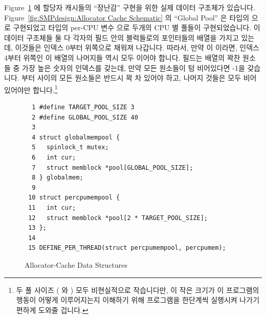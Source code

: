 Figure~\ref{fig:SMPdesign:Allocator-Cache Data Structures} 에 할당자 캐시들의
``장난감'' 구현을 위한 실제 데이터 구조체가 있습니다.
Figure~\ref{fig:SMPdesign:Allocator Cache Schematic} 의 ``Global Pool'' 은
 타입의  으로 구현되었고  타입의 per-CPU 변수  으로 두개의 CPU 별 풀들이
구현되었습니다.
이 데이터 구조체들 둘 다 각자의  필드 안의 블럭들로의 포인터들의
배열을 가지고 있는데, 이것들은 인덱스 0부터 위쪽으로 채워져 나갑니다.
따라서, 만약  이  이라면, 인덱스 4부터 위쪽인 이
배열의 나머지들 역시 모두  이어야 합니다.
 필드는  배열의 꽉찬 원소들 중 가장 높은 숫자의 인덱스를
갖는데, 만약 모든 원소들이 텅 비어있다면 -1을 갖습니다.
 부터  사이의 모든
원소들은 반드시 꽉 차 있어야 하고, 나머지 것들은 모두 비어있어야만
합니다.\footnote{
	두 풀 사이즈 ( 와 ) 모두
	비현실적으로 작습니다만, 이 작은 크기가 이 프로그램의 행동이 어떻게
	이루어지는지 이해하기 위해 프로그램을 한단계씩 실행시켜 나가기 편하게
	도와줄 겁니다.}

\begin{figure}[htbp]
{ \scriptsize
\begin{verbatim}
  1 #define TARGET_POOL_SIZE 3
  2 #define GLOBAL_POOL_SIZE 40
  3
  4 struct globalmempool {
  5   spinlock_t mutex;
  6   int cur;
  7   struct memblock *pool[GLOBAL_POOL_SIZE];
  8 } globalmem;
  9
 10 struct percpumempool {
 11   int cur;
 12   struct memblock *pool[2 * TARGET_POOL_SIZE];
 13 };
 14
 15 DEFINE_PER_THREAD(struct percpumempool, percpumem);
\end{verbatim}
}
\caption{Allocator-Cache Data Structures}
\label{fig:SMPdesign:Allocator-Cache Data Structures}
\end{figure}

